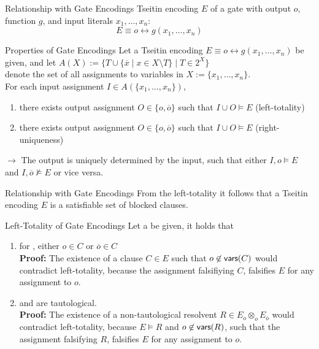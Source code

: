 \documentclass[t]{sdqbeamer}
\begin{document}
\begin{frame}{Relationship with Gate Encodings}
Tseitin encoding $E$ of a gate with output $o$, function $g$, and input literals $x_1, \dots, x_n$: $$E \equiv o \leftrightarrow g(x_1, \dots, x_n)$$ 
\vspace*{-1em}
\begin{block}{Properties of Gate Encodings}
Let a Tseitin encoding $E \equiv o \leftrightarrow g(x_1, \dots, x_n)$ be given,
and let $A(X) := \{ T \cup \{ \overline x \mid x \in X \setminus T \} \mid T \in 2^X \}$\\ 
denote the set of all assignments to variables in $X := \{x_1, \dots, x_n\}$.\\[1ex]
For each input assignment $I \in A(\{x_1, \dots, x_n\})$, \\[1ex]
\begin{enumerate}\setlength{\itemsep}{1ex}
\item there exists  output assignment $O \in \{o, \overline o\}$ such that $I \cup O \models E$ \quad (left-totality)
\item there exists  output assignment $O \in \{o, \overline o\}$ such that $I \cup O \models E$ \quad (right-uniqueness)\\[1ex]
\end{enumerate}
$\bm\rightarrow$ The output is uniquely determined by the input, such that either $I, o \models E$ and $I, \overline o \not\models E$ or vice versa.
\end{block}
\end{frame}


\begin{frame}{Relationship with Gate Encodings}
From the left-totality it follows that a Tseitin encoding $E$ is a satisfiable set of blocked clauses.\\[1em]
\begin{block}{Left-Totality of Gate Encodings}
Let a  be given, it holds that\\[1em]
\begin{enumerate}\setlength{\itemsep}{1ex}
\item for , either $o \in C$ or $\overline o \in C$\\[1ex]
\textbf{Proof:} The existence of a clause $C \in E$ such that $o \not\in \textsf{vars} (C)$ would contradict left-totality, because the assignment falsifiying $C$, falsifies $E$ for any assignment to $o$.
\item and  are tautological.\\[1ex]
\textbf{Proof:} The existence of a non-tautological resolvent $R \in E_o \otimes_o E_{\overline o}$ would contradict left-totality, because $E \models R$ and $o \not\in \textsf{vars} (R)$, such that the assignment falsifying $R$, falsifies $E$ for any assignment to $o$.
\end{enumerate}
\end{block}
\end{frame}
\end{document}
